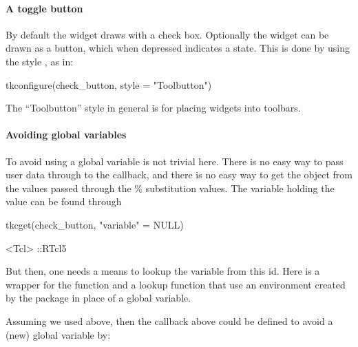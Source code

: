 \paragraph{A toggle button}

By default the widget draws with a check box. Optionally the widget
can be drawn as a button, which when depressed indicates a 
state. This is done by using the style , as in:
\begin{Schunk}
\begin{Sinput}
 tkconfigure(check_button, style = "Toolbutton")
\end{Sinput}
\end{Schunk}

The ``Toolbutton'' style in general is for placing widgets into toolbars.


\paragraph{Avoiding global variables}
To avoid using a global variable is not trivial here. There is no easy
way to pass user data through to the callback, and there is no easy
way to get the \R\/ object from the values passed through the \%
substitution values. The variable holding the value can be found
through
\begin{Schunk}
\begin{Sinput}
 tkcget(check_button, "variable" = NULL)
\end{Sinput}
\begin{Soutput}
<Tcl> ::RTcl5 
\end{Soutput}
\end{Schunk}

But then, one needs a means to lookup the variable from this id. Here is a
wrapper for the  function and a lookup function that
use an environment created by the  package in place of a
global variable.

\begin{Schunk}
\end{Schunk}

Assuming we used  above, then the callback above
could be defined to avoid a (new) global variable by:



